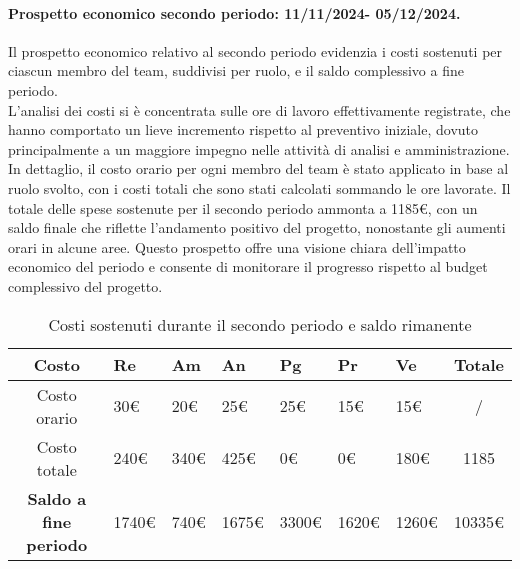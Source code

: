 \paragraph{Prospetto economico secondo periodo: 11/11/2024- 05/12/2024.}
Il prospetto economico relativo al secondo periodo evidenzia i costi sostenuti per ciascun membro del team, suddivisi per ruolo, e il saldo complessivo a fine periodo.\\
L'analisi dei costi si è concentrata sulle ore di lavoro effettivamente registrate, che hanno comportato un lieve incremento rispetto al preventivo iniziale, dovuto principalmente a un maggiore impegno nelle attività di analisi e amministrazione. In dettaglio, il costo orario per ogni membro del team è stato applicato in base al ruolo svolto, con i costi totali che sono stati calcolati sommando le ore lavorate. Il totale delle spese sostenute per il secondo periodo ammonta a 1185€, con un saldo finale che riflette l'andamento positivo del progetto, nonostante gli aumenti orari in alcune aree. Questo prospetto offre una visione chiara dell'impatto economico del periodo e consente di monitorare il progresso rispetto al budget complessivo del progetto.
\begin{table}[!h]
    \centering
    \renewcommand{\arraystretch}{1.5}
    \begin{tabularx}{\textwidth}{|c|X|X|X|X|X|X|c|}\hline
    \rowcolor[HTML]{FFD700} 
    \textbf{Costo} & \textbf{Re} & \textbf{Am} & \textbf{An} & \textbf{Pg} & \textbf{Pr} & \textbf{Ve} & \textbf{Totale} \\ \hline
    Costo orario & 30€ & 20€ & 25€ & 25€ & 15€ & 15€ & /  \\ \hline
    Costo totale & 240€ & 340€ & 425€ & 0€ & 0€ & 180€ & 1185 \\ \hline
    \rowcolor[HTML]{FFD700} 
    \textbf{Saldo a fine periodo}  & 1740€ & 740€ & 1675€ & 3300€ & 1620€ & 1260€ & 10335€ \\ \hline
    \end{tabularx}
    \caption{Costi sostenuti durante il secondo periodo e saldo rimanente}
\end{table}


